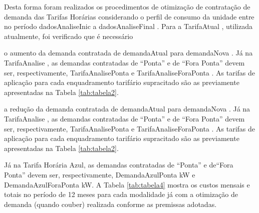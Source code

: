 \documentclass[a4paper,12pt]{abntex2}
\renewcommand{\arraystretch}{1.3}
\begin{document}
{{{{{{Desta forma  foram realizados os procedimentos de otimização de contratação de demanda 
das  Tarifas  Horárias  considerando  o  perfil  de  consumo  da  unidade  entre  no  período 
{{ dadosAnaliseInic }}  a  {{ dadosAnaliseFinal }}. Para a {{ TarifaAtual }}, utilizada atualmente, foi verificado 
que é necessário {%
o aumento  da demanda contratada de  {{ demandaAtual }} para  {{ demandaNova }}. Já na {{ TarifaAnalise }},  as  demandas  contratadas  de  “Ponta”  e  de  “Fora  Ponta”  devem  ser, 
respectivamente,  {{ TarifaAnalisePonta }} e  {{ TarifaAnaliseForaPonta }}.  As tarifas de aplicação para cada enquadramento tarifário 
supracitado são as previamente apresentadas na Tabela \ref{tab:tabela2}.
{%
a redução da demanda contratada de  {{ demandaAtual }} para  {{ demandaNova }}. Já na {{ TarifaAnalise }},  as  demandas  contratadas  de  “Ponta”  e  de  “Fora  Ponta”  devem  ser, 
respectivamente,  {{ TarifaAnalisePonta }} e  {{ TarifaAnaliseForaPonta }}.  As tarifas de aplicação para cada enquadramento tarifário 
supracitado são as previamente apresentadas na Tabela \ref{tab:tabela2}.
{%
Já na Tarifa Horária Azul, as demandas contratadas de ``Ponta'' e de``Fora Ponta'' devem ser, respectivamente, {{ DemandaAzulPonta }} kW e {{ DemandaAzulForaPonta}} kW.
A  Tabela  \ref{tab:tabela4}  mostra  os  custos  mensais  e  totais  no  período  de  12  meses  para  cada 
modalidade  já  com  a  otimização  de  demanda  (quando  couber)  realizada  conforme  as 
premissas adotadas.

\begin{table}[!ht]
    \centering
    \caption{Comparação entre os valores de conta otimizados}
    \label{tab:tabela4}
    \setlength{\tabcolsep}{5pt}
    \renewcommand{\arraystretch}{1.3}
    \resizebox{1.0\textwidth}{!}{

    \begin{tabular}{|c|c|c{%
    \hline
    \textbf{DATA} & 
    \cellcolor{green!30}\textbf{A4 Verde Otimizada (R\$)} & 
    \cellcolor{blue!30}\textbf{A4 Azul Otimizada (R\$)} 
    {%
    \hline
        
}}}
\end{tabular}}
\end{table}}}}}}}}}}
\end{document}
